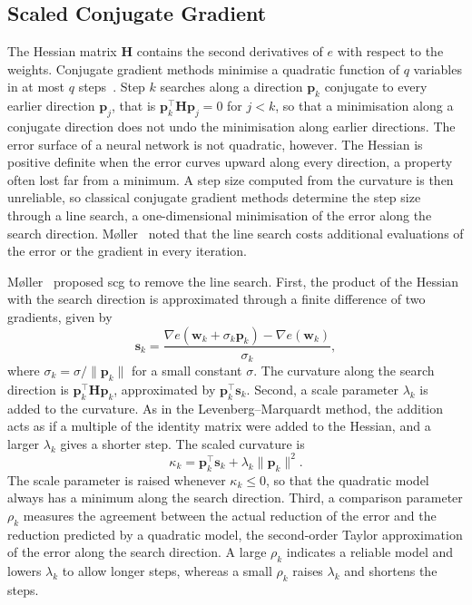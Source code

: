 \documentclass[conference]{IEEEtran}
\newcommand{\vect}[1]{\mathbf{#1}}
\begin{document}
\subsection{Scaled Conjugate Gradient}

The Hessian matrix $\vect{H}$ contains the second derivatives of $e$ with respect
to the weights. Conjugate gradient methods minimise a quadratic function of $q$
variables in at most $q$ steps~\cite{hestenes1952}. Step $k$ searches along a
direction $\vect{p}_k$ conjugate to every earlier direction $\vect{p}_j$, that is
$\vect{p}_k^{\top} \vect{H} \vect{p}_j = 0$ for $j < k$, so that a minimisation
along a conjugate direction does not undo the minimisation along earlier
directions. The error surface of a neural network is not quadratic, however. The
Hessian is positive definite when the error curves upward along every direction, a
property often lost far from a minimum. A step size computed from the curvature is then
unreliable, so classical conjugate gradient methods determine the step size
through a line search, a one-dimensional minimisation of
the error along the search direction. M{\o}ller~\cite{moller1993}
noted that the line search costs additional evaluations of the error or the gradient in every iteration.

M{\o}ller~\cite{moller1993} proposed \gls{scg} to remove the line search. First,
the product of the Hessian with the search direction is approximated through a
finite difference of two gradients, given by
\begin{equation}
\vect{s}_k = \frac{\nabla e(\vect{w}_k + \sigma_k \vect{p}_k) - \nabla e(\vect{w}_k)}{\sigma_k},
\end{equation}
where $\sigma_k = \sigma / \lVert \vect{p}_k \rVert$ for a small constant $\sigma$.
The curvature along the search direction is $\vect{p}_k^{\top} \vect{H}
\vect{p}_k$, approximated by $\vect{p}_k^{\top} \vect{s}_k$. Second, a scale
parameter $\lambda_k$ is added to the curvature. As in the Levenberg--Marquardt
method, the addition acts as if a multiple of the identity matrix were added to
the Hessian, and a larger $\lambda_k$ gives a shorter step. The scaled curvature is
\begin{equation}
\kappa_k = \vect{p}_k^{\top} \vect{s}_k + \lambda_k \lVert \vect{p}_k \rVert^2.
\end{equation}
The scale parameter is raised whenever $\kappa_k \le 0$, so that the quadratic
model always has a minimum along the search direction. Third, a comparison parameter $\rho_k$ measures
the agreement between the actual reduction of the error and the reduction predicted
by a quadratic model, the second-order Taylor approximation of the error along the
search direction. A large $\rho_k$ indicates a reliable model and lowers
$\lambda_k$ to allow longer steps, whereas a small $\rho_k$ raises $\lambda_k$ and
shortens the steps.
\end{document}
